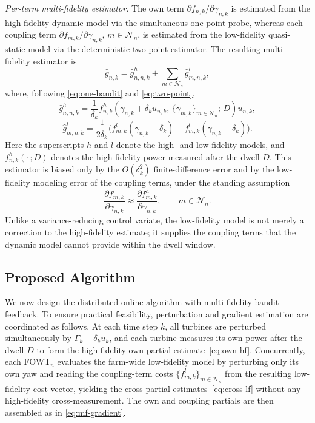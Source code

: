 \emph{Per-term multi-fidelity estimator.} The own term $\partial f_{n,k}/\partial\gamma_{n,k}$ is estimated from the high-fidelity dynamic model via the simultaneous one-point probe, whereas each coupling term $\partial f_{m,k}/\partial\gamma_{n,k}$, $m\in\mathcal{N}_n$, is estimated from the low-fidelity quasi-static model via the deterministic two-point estimator. The resulting multi-fidelity estimator is
\begin{equation} \label{eq:mf-gradient}
    \hat{g}_{n,k} = \hat{g}^{h}_{n,n,k} + \sum_{m\in\mathcal{N}_n}\hat{g}^{l}_{m,n,k},
\end{equation}
where, following \eqref{eq:one-bandit} and \eqref{eq:two-point},
\begin{equation} \label{eq:own-hf}
    \hat{g}^{h}_{n,n,k} = \frac{1}{\delta_k} f^{h}_{n,k}\!\left(\gamma_{n,k}+\delta_k u_{n,k},\,\{\gamma_{m,k}\}_{m\in\mathcal{N}_n};\,D\right) u_{n,k},
\end{equation}
\begin{equation} \label{eq:cross-lf}
    \hat{g}^{l}_{m,n,k} = \frac{1}{2\delta_k}\Big( f^{l}_{m,k}(\gamma_{n,k}+\delta_k) - f^{l}_{m,k}(\gamma_{n,k}-\delta_k) \Big).
\end{equation}
Here the superscripts $h$ and $l$ denote the high- and low-fidelity models, and $f^{h}_{n,k}(\cdot\,;D)$ denotes the high-fidelity power measured after the dwell $D$. This estimator is biased only by the $O(\delta_k^2)$ finite-difference error and by the low-fidelity modeling error of the coupling terms, under the standing assumption
\begin{equation} \label{eq:coupling-assumption}
    \frac{\partial f^{l}_{m,k}}{\partial\gamma_{n,k}} \approx \frac{\partial f^{h}_{m,k}}{\partial\gamma_{n,k}}, \qquad m\in\mathcal{N}_n.
\end{equation}
Unlike a variance-reducing control variate, the low-fidelity model is not merely a correction to the high-fidelity estimate; it supplies the coupling terms that the dynamic model cannot provide within the dwell window.

\subsection{Proposed Algorithm} \label{sec:algorithm}
We now design the distributed online algorithm with multi-fidelity bandit feedback. To ensure practical feasibility, perturbation and gradient estimation are coordinated as follows. At each time step $k$, all turbines are perturbed simultaneously by $\Gamma_k + \delta_k u_k$, and each turbine measures its own power after the dwell $D$ to form the high-fidelity own-partial estimate~\eqref{eq:own-hf}. Concurrently, each FOWT$_n$ evaluates the farm-wide low-fidelity model by perturbing only its own yaw and reading the coupling-term costs $\{f^{l}_{m,k}\}_{m\in\mathcal{N}_n}$ from the resulting low-fidelity cost vector, yielding the cross-partial estimates~\eqref{eq:cross-lf} without any high-fidelity cross-measurement. The own and coupling partials are then assembled as in \eqref{eq:mf-gradient}.

